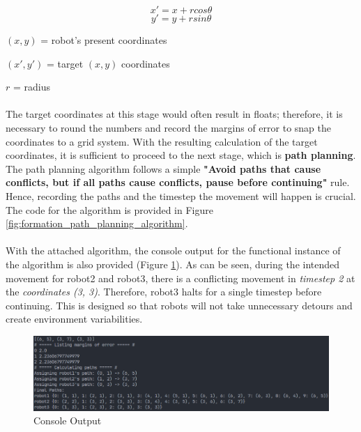 \[x' = x + rcos\theta\]
\[y' = y + rsin\theta\]

\begin{description}
    \item 
    \item[where:]
    \item \((x, y)\) = robot's present coordinates
    \item \((x', y')\) = target \((x, y)\) coordinates
    \item \(r\) = radius
\end{description}

\paragraph*{}
The target coordinates at this stage would often result in floats; therefore, it is necessary to round the numbers and record the margins of error to snap the coordinates to a grid system. With the resulting calculation of the target coordinates, it is sufficient to proceed to the next stage, which is \textbf{path planning}. The path planning algorithm follows a simple \textbf{"Avoid paths that cause conflicts, but if all paths cause conflicts, pause before continuing"} rule. Hence, recording the paths and the timestep the movement will happen is crucial. The code for the algorithm is provided in Figure \ref{fig:formation_path_planning_algorithm}.

\paragraph*{}
With the attached algorithm, the console output for the functional instance of the algorithm is also provided (Figure \ref{fig:formation_console_output}). As can be seen, during the intended movement for robot2 and robot3, there is a conflicting movement in \textit{timestep 2} at the \textit{coordinates (3, 3)}. Therefore, robot3 halts for a single timestep before continuing. This is designed so that robots will not take unnecessary detours and create environment variabilities.

\begin{figure}[H]
    \centering
    \includegraphics[width=1\linewidth]{assets/images/formation/console_output.png}
    \caption{Console Output}
    \label{fig:formation_console_output}
\end{figure}

